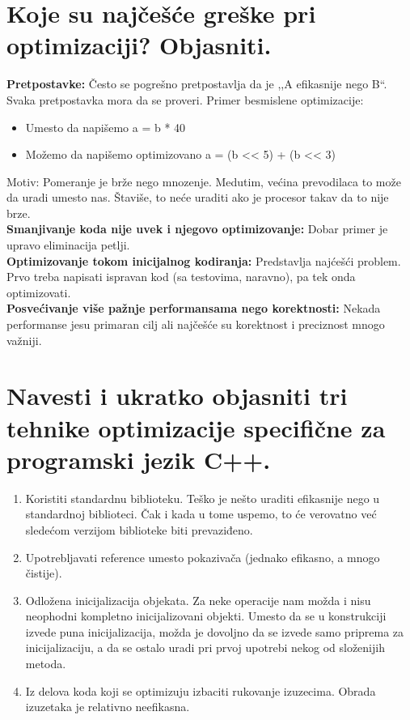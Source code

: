 \documentclass[a4paper]{article}
\begin{document}
\section{Koje su najčešće greške pri optimizaciji? Objasniti.}
  \textbf{Pretpostavke:} Često se pogrešno pretpostavlja da je ,,A efikasnije nego B``. 
  Svaka pretpostavka mora da se proveri. Primer besmislene optimizacije:
  \begin{itemize}
    \item Umesto da napišemo a = b * 40
    \item Možemo da napišemo optimizovano a = (b << 5) + (b << 3)
  \end{itemize}
  Motiv: Pomeranje je brže nego mnozenje. Medutim, većina prevodilaca to može da uradi umesto nas.
  Štaviše, to neće uraditi ako je procesor takav da to nije brze.\\
  
  \textbf{Smanjivanje koda nije uvek i njegovo optimizovanje:} Dobar primer je upravo 
  eliminacija petlji. \\
  
  \textbf{Optimizovanje tokom inicijalnog kodiranja:} Predstavlja najćešći problem. 
  Prvo treba napisati ispravan kod (sa testovima, naravno), pa tek onda optimizovati.\\
  
  \textbf{Posvećivanje više pažnje performansama nego korektnosti:} Nekada performanse jesu 
  primaran cilj ali najčešće su korektnost i preciznost mnogo važniji.
  
\section{Navesti i ukratko objasniti tri tehnike optimizacije specifične za programski jezik C++.}
  \begin{enumerate}
    \item Koristiti standardnu biblioteku. Teško je nešto uraditi efikasnije nego u standardnoj 
          biblioteci. Čak i kada u tome uspemo, to će verovatno već sledećom verzijom biblioteke 
          biti prevaziđeno.
    \item Upotrebljavati reference umesto pokazivača (jednako efikasno, a mnogo čistije).
    \item Odložena inicijalizacija objekata. Za neke operacije nam možda i nisu neophodni kompletno 
          inicijalizovani objekti. Umesto da se u konstrukciji izvede puna inicijalizacija, 
          možda je dovoljno da se izvede samo priprema za inicijalizaciju, a da se ostalo uradi pri 
          prvoj upotrebi nekog od složenijih metoda.
    \item Iz delova koda koji se optimizuju izbaciti rukovanje izuzecima. Obrada izuzetaka je 
          relativno neefikasna.
  \end{enumerate}
\end{document}
